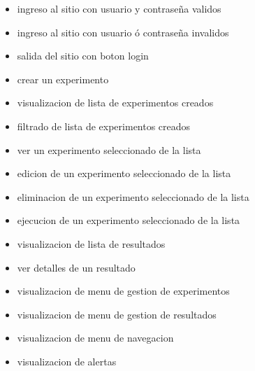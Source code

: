 \begin{itemize}
\item ingreso al sitio con usuario y contraseña validos
\item ingreso al sitio con usuario ó contraseña invalidos
\item salida del sitio con boton login

\item crear un experimento

\item visualizacion de lista de experimentos creados
\item filtrado de lista de experimentos creados

\item ver un experimento seleccionado de la lista
\item edicion de un experimento seleccionado de la lista
\item eliminacion de un experimento seleccionado de la lista
\item ejecucion de un experimento seleccionado de la lista

\item visualizacion de lista de resultados
\item ver detalles de un resultado
\item visualizacion de menu de gestion de experimentos
\item visualizacion de menu de gestion de resultados
\item visualizacion de menu de navegacion
\item visualizacion de alertas
\end{itemize}
\newpage